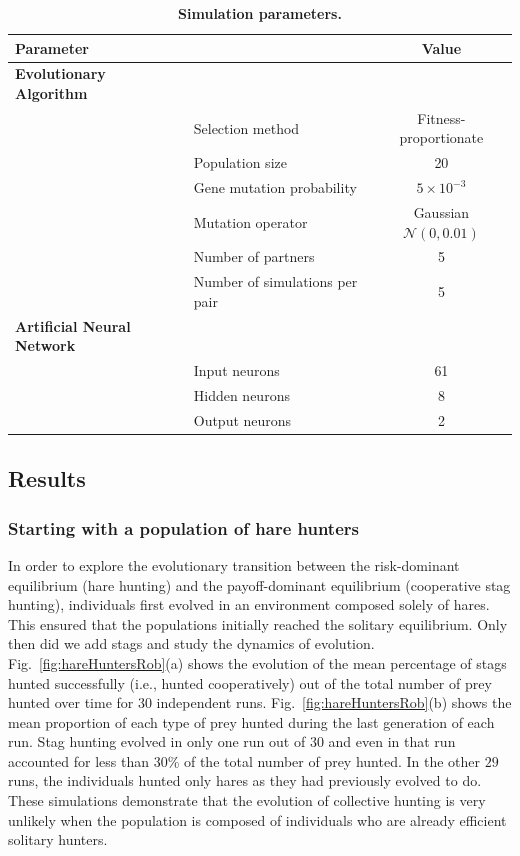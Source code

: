       \begin{table}[ht]
        \centering
          \caption{\textbf{Simulation parameters.}}
          \begin{tabular}{|l|l|c|}
            \hline
            \multicolumn{2}{|l|}{\textbf{Parameter}} & \textbf{Value} \\
            \hline
            \textbf{Evolutionary Algorithm} & & \\
            \hline
            & Selection method & Fitness-proportionate \\
            \hline
            & Population size & 20 \\
            \hline
            & Gene mutation probability & \(5 \times 10^{-3}\) \\
            \hline
            & Mutation operator & Gaussian \(\mathcal{N}(0, 0.01)\) \\
            \hline
            & Number of partners & 5 \\
            \hline
            & Number of simulations per pair & 5 \\
            \hline

            \textbf{Artificial Neural Network} & & \\
            \hline
            & Input neurons & 61 \\
            \hline
            & Hidden neurons & 8 \\
            \hline
            & Output neurons & 2 \\
            \hline
          \end{tabular}
        \label{table:tableParameters}
      \end{table}

  \subsection{Results}
  \label{sec:results}
    \subsubsection{Starting with a population of hare hunters}
      In order to explore the evolutionary transition between the risk-dominant equilibrium (hare hunting) and the payoff-dominant equilibrium (cooperative stag hunting), individuals first evolved in an environment composed solely of hares. This ensured that the populations initially reached the solitary equilibrium. Only then did we add stags and study the dynamics of evolution. Fig.~\ref{fig:hareHuntersRob}(a) shows the evolution of the mean percentage of stags hunted successfully (i.e., hunted cooperatively) out of the total number of prey hunted over time for 30 independent runs. Fig.~\ref{fig:hareHuntersRob}(b) shows the mean proportion of each type of prey hunted during the last generation of each run. Stag hunting evolved in only one run out of $30$ and even in that run accounted for less than 30\% of the total number of prey hunted. In the other $29$ runs, the individuals hunted only hares as they had previously evolved to do. These simulations demonstrate that the evolution of collective hunting is very unlikely when the population is composed of individuals who are already efficient solitary hunters.

